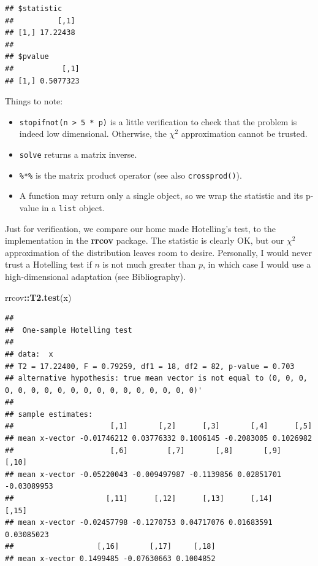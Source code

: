 \documentclass[]{book}
\newenvironment{Shaded}{\begin{snugshade}}{\end{snugshade}}
\newcommand{\KeywordTok}[1]{\textcolor[rgb]{0.13,0.29,0.53}{\textbf{#1}}}
\newcommand{\OperatorTok}[1]{\textcolor[rgb]{0.81,0.36,0.00}{\textbf{#1}}}
\newcommand{\NormalTok}[1]{#1}
\providecommand{\tightlist}{%
  \setlength{\itemsep}{0pt}\setlength{\parskip}{0pt}}
\theoremstyle{definition}
\theoremstyle{definition}
\theoremstyle{definition}
\theoremstyle{remark}
\begin{document}
\begin{verbatim}
## $statistic
##          [,1]
## [1,] 17.22438
## 
## $pvalue
##           [,1]
## [1,] 0.5077323
\end{verbatim}

Things to note:

\begin{itemize}
\tightlist
\item
  \texttt{stopifnot(n\ \textgreater{}\ 5\ *\ p)} is a little
  verification to check that the problem is indeed low dimensional.
  Otherwise, the \(\chi^2\) approximation cannot be trusted.
\item
  \texttt{solve} returns a matrix inverse.
\item
  \texttt{\%*\%} is the matrix product operator (see also
  \texttt{crossprod()}).
\item
  A function may return only a single object, so we wrap the statistic
  and its p-value in a \texttt{list} object.
\end{itemize}

Just for verification, we compare our home made Hotelling's test, to the
implementation in the \textbf{rrcov} package. The statistic is clearly
OK, but our \(\chi^2\) approximation of the distribution leaves room to
desire. Personally, I would never trust a Hotelling test if \(n\) is not
much greater than \(p\), in which case I would use a high-dimensional
adaptation (see Bibliography).

\begin{Shaded}
\begin{Highlighting}[]
\NormalTok{rrcov}\OperatorTok{::}\KeywordTok{T2.test}\NormalTok{(x)}
\end{Highlighting}
\end{Shaded}

\begin{verbatim}
## 
##  One-sample Hotelling test
## 
## data:  x
## T2 = 17.22400, F = 0.79259, df1 = 18, df2 = 82, p-value = 0.703
## alternative hypothesis: true mean vector is not equal to (0, 0, 0, 0, 0, 0, 0, 0, 0, 0, 0, 0, 0, 0, 0, 0, 0, 0)' 
## 
## sample estimates:
##                      [,1]       [,2]      [,3]       [,4]      [,5]
## mean x-vector -0.01746212 0.03776332 0.1006145 -0.2083005 0.1026982
##                      [,6]         [,7]       [,8]       [,9]       [,10]
## mean x-vector -0.05220043 -0.009497987 -0.1139856 0.02851701 -0.03089953
##                     [,11]      [,12]      [,13]      [,14]      [,15]
## mean x-vector -0.02457798 -0.1270753 0.04717076 0.01683591 0.03085023
##                   [,16]       [,17]     [,18]
## mean x-vector 0.1499485 -0.07630663 0.1004852
\end{verbatim}
\end{document}
